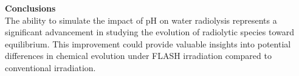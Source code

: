 \begin{talk}
\textbf{Conclusions}\\
The ability to simulate the impact of pH on water radiolysis represents a significant advancement in studying the evolution of radiolytic species toward equilibrium. This improvement could provide valuable insights into potential differences in chemical evolution under FLASH irradiation compared to conventional irradiation.


\medskip



\end{talk}

